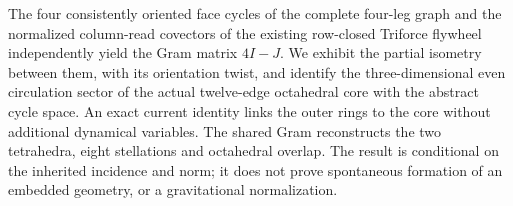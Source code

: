 The four consistently oriented face cycles of the complete four-leg graph and the normalized column-read covectors of the existing row-closed Triforce flywheel independently yield the Gram matrix $4I-J$. We exhibit the partial isometry between them, with its orientation twist, and identify the three-dimensional even circulation sector of the actual twelve-edge octahedral core with the abstract cycle space. An exact current identity links the outer rings to the core without additional dynamical variables. The shared Gram reconstructs the two tetrahedra, eight stellations and octahedral overlap. The result is conditional on the inherited incidence and norm; it does not prove spontaneous formation of an embedded geometry, or a gravitational normalization.
